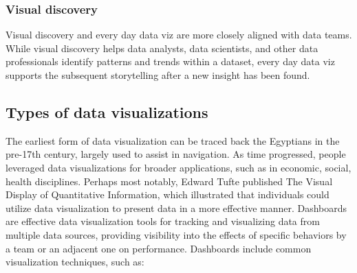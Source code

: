 \documentclass[MSE,Master,english]{twbook}%
\begin{document}
\subsubsection{Visual discovery}
Visual discovery and every day data viz are more closely aligned with data teams. While visual discovery helps data analysts, data scientists, and other data professionals identify patterns and trends within a dataset, every day data viz supports the subsequent storytelling after a new insight has been found.

\subsection{Types of data visualizations}
The earliest form of data visualization can be traced back the Egyptians in the pre-17th century\cite{dataviz}, largely used to assist in navigation. As time progressed, people leveraged data visualizations for broader applications, such as in economic, social, health disciplines. Perhaps most notably, Edward Tufte published The Visual Display of Quantitative Information\cite{tufte1985visual}, which illustrated that individuals could utilize data visualization to present data in a more effective manner. Dashboards are effective data visualization tools for tracking and visualizing data from multiple data sources, providing visibility into the effects of specific behaviors by a team or an adjacent one on performance. Dashboards include common visualization techniques, such as:
\end{document}
